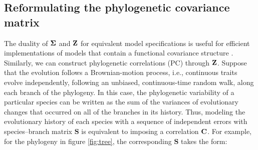 \documentclass[12pt]{article}
\begin{document}



\subsection*{Reformulating the phylogenetic covariance matrix}


\newcommand{\bS}{{\mathbf S}}
\newcommand{\bJ}{{\mathbf J}}
\newcommand{\bB}{{\mathbf B}}
\newcommand{\bBadj}{{\mathbf B}_{\mbox{\tiny adj}}}
\newcommand{\bomega}{{\boldsymbol \omega}}
\newcommand{\bell}{{\boldsymbol \ell}}
\newcommand{\e}{{ \epsilon}}

The duality of ${\boldsymbol \Sigma}$ and ${\mathbf Z}$ for equivalent model specifications is useful for efficient implementations of models that contain a functional  covariance structure \citep{hefley2017basis}. 
Similarly, we can construct phylogenetic correlations (PC) through ${\mathbf Z}$.
Suppose that the evolution follows a Brownian-motion process, i.e., continuous traits evolve independently, following an unbiased, continuous-time random walk, along each branch of the phylogeny.
In this case, the phylogenetic variability of a particular species can be written as the sum of the variances of evolutionary changes that occurred on all of the branches in its history. 
Thus, modeling the evolutionary history of each species with a sequence of independent errors with species--branch matrix $\bS$ is equivalent to imposing a correlation ${\mathbf C}$.
For example, for the phylogeny in figure \ref{fig:tree}, the corresponding $\bS$ takes the form:
\end{document}
